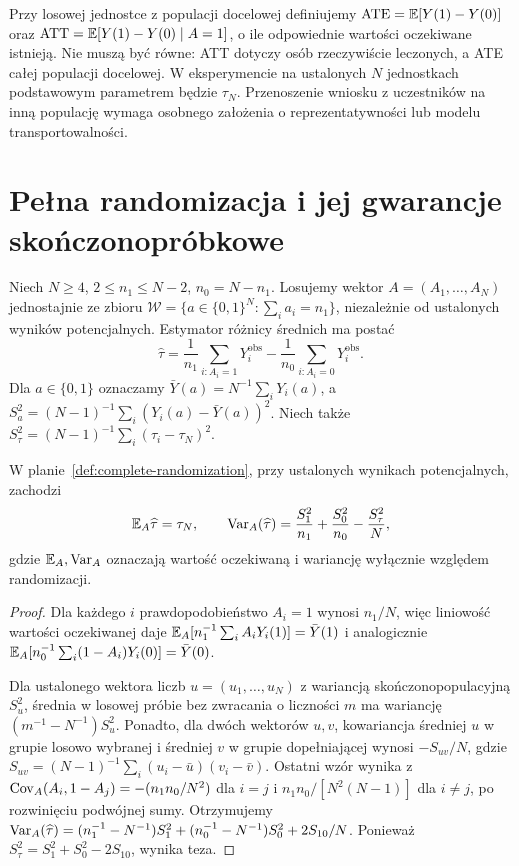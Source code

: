 \begin{uwaga}
Przy losowej jednostce z populacji docelowej definiujemy $\mathrm{ATE}=\mathbb E[Y(1)-Y(0)]$ oraz $\mathrm{ATT}=\mathbb E[Y(1)-Y(0)\mid A=1]$, o ile odpowiednie wartości oczekiwane istnieją. Nie muszą być równe: ATT dotyczy osób rzeczywiście leczonych, a ATE całej populacji docelowej. W eksperymencie na ustalonych $N$ jednostkach podstawowym parametrem będzie $\tau_N$. Przenoszenie wniosku z uczestników na inną populację wymaga osobnego założenia o reprezentatywności lub modelu transportowalności.
\end{uwaga}

\section{Pełna randomizacja i jej gwarancje skończonopróbkowe}
\begin{definicja}\label{def:complete-randomization}
Niech $N\ge4$, $2\le n_1\le N-2$, $n_0=N-n_1$. Losujemy wektor $A=(A_1,\ldots,A_N)$ jednostajnie ze zbioru
$\mathcal W=\{a\in\{0,1\}^N:\sum_i a_i=n_1\}$, niezależnie od ustalonych wyników potencjalnych. Estymator różnicy średnich ma postać
\[
\widehat\tau=\frac1{n_1}\sum_{i:A_i=1}Y_i^{\mathrm{obs}}-\frac1{n_0}\sum_{i:A_i=0}Y_i^{\mathrm{obs}}.
\]
Dla $a\in\{0,1\}$ oznaczamy $\bar Y(a)=N^{-1}\sum_iY_i(a)$, a $S_a^2=(N-1)^{-1}\sum_i(Y_i(a)-\bar Y(a))^2$. Niech także $S_\tau^2=(N-1)^{-1}\sum_i(\tau_i-\tau_N)^2$.
\end{definicja}

\begin{twierdzenie}\label{thm:neyman-variance}
W planie~\ref{def:complete-randomization}, przy ustalonych wynikach potencjalnych, zachodzi
\[
\mathbb E_A\widehat\tau=\tau_N,\qquad
\operatorname{Var}_A(\widehat\tau)=\frac{S_1^2}{n_1}+\frac{S_0^2}{n_0}-\frac{S_\tau^2}{N},
\]
gdzie $\mathbb E_A,\operatorname{Var}_A$ oznaczają wartość oczekiwaną i wariancję wyłącznie względem randomizacji.
\end{twierdzenie}
\begin{proof}
Dla każdego $i$ prawdopodobieństwo $A_i=1$ wynosi $n_1/N$, więc liniowość wartości oczekiwanej daje $\mathbb E_A[n_1^{-1}\sum_i A_iY_i(1)]=\bar Y(1)$ i analogicznie $\mathbb E_A[n_0^{-1}\sum_i(1-A_i)Y_i(0)]=\bar Y(0)$.

Dla ustalonego wektora liczb $u=(u_1,\ldots,u_N)$ z wariancją skończonopopulacyjną $S_u^2$, średnia w losowej próbie bez zwracania o liczności $m$ ma wariancję $(m^{-1}-N^{-1})S_u^2$. Ponadto, dla dwóch wektorów $u,v$, kowariancja średniej $u$ w grupie losowo wybranej i średniej $v$ w grupie dopełniającej wynosi $-S_{uv}/N$, gdzie $S_{uv}=(N-1)^{-1}\sum_i(u_i-\bar u)(v_i-\bar v)$. Ostatni wzór wynika z $\operatorname{Cov}_A(A_i,1-A_j)=-(n_1n_0/N^2)$ dla $i=j$ i $n_1n_0/[N^2(N-1)]$ dla $i\ne j$, po rozwinięciu podwójnej sumy. Otrzymujemy
$\operatorname{Var}_A(\widehat\tau)=(n_1^{-1}-N^{-1})S_1^2+(n_0^{-1}-N^{-1})S_0^2+2S_{10}/N$.
Ponieważ $S_\tau^2=S_1^2+S_0^2-2S_{10}$, wynika teza.
\end{proof}


